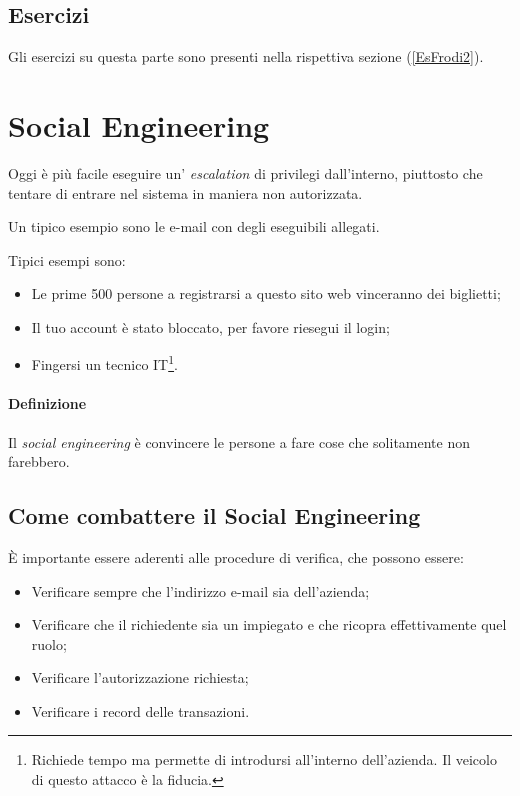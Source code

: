 \subsection{Esercizi}

Gli esercizi su questa parte sono presenti nella rispettiva sezione
(\ref{EsFrodi2}).

\section{Social Engineering}
		
Oggi è più facile eseguire un' \textit{escalation} di privilegi dall'interno,
piuttosto che tentare di entrare nel sistema in maniera non autorizzata.

Un tipico esempio sono le e-mail con degli eseguibili allegati.

Tipici esempi sono:
\begin{itemize}
  \item Le prime 500 persone a registrarsi a questo sito web vinceranno dei
  biglietti;
  \item Il tuo account è stato bloccato, per favore riesegui il login;
  \item Fingersi un tecnico IT\footnote{Richiede tempo ma permette di
introdursi all'interno dell'azienda. Il veicolo di questo attacco è la fiducia.}.
\end{itemize}

\paragraph*{Definizione} Il \textit{social engineering} è convincere le persone
a fare cose che solitamente non farebbero.

\subsection{Come combattere il Social Engineering}

È importante essere aderenti alle procedure di verifica, che possono essere:
\begin{itemize}
  \item Verificare sempre che l'indirizzo e-mail sia dell'azienda;
  \item Verificare che il richiedente sia un impiegato e che ricopra
  effettivamente quel ruolo;
  \item Verificare l'autorizzazione richiesta;
  \item Verificare i record delle transazioni.
\end{itemize}

